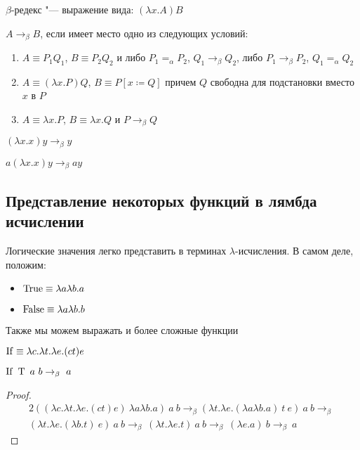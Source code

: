 \begin{definition}
	$\beta$-редекс "--- выражение вида: $\left(\lambda{}x.A\right)B$
\end{definition}

\begin{definition}
	$A\to_{\beta}B$, если имеет место одно из следующих условий:
	\begin{enumerate}
		\item $A\equiv{}P_{1}Q_{1}$, $B\equiv{}P_{2}Q_{2}$ и либо $P_{1}=_{\alpha}P_{2}$, $Q_{1}\to_{\beta}Q_{2}$, либо
		$P_{1}\to_{\beta}P_{2}$, $Q_{1}=_{\alpha}Q_{2}$
		\item $A\equiv\left(\lambda{}x.P\right) Q$, $B\equiv P[x\coloneqq{}Q]$ причем $Q$ свободна для подстановки вместо $x$ в $P$ 
		\item $A\equiv\lambda{}x.P$, $B\equiv\lambda{}x.Q$ и $P\to_{\beta}Q$
	\end{enumerate}
	\begin{example} 
		$\left(\lambda{}x.x\right) y\to_{\beta} y$
	\end{example}
	\begin{example}
		 $a \left(\lambda{}x.x\right) y\to_{\beta} a y$
	\end{example}
\end{definition}

\subsection{Представление некоторых функций в лямбда исчислении}
Логические значения легко представить в терминах $\lambda$-исчисления. В самом деле, положим:
\begin{itemize}
	\item $\operatorname{True}  \equiv \lambda{}a\lambda{}b.a$ 
	\item $\operatorname{False} \equiv \lambda{}a\lambda{}b.b$
\end{itemize}

\newcommand{\If}{\lambda{}c.\lambda{}t.\lambda{}e.(c t) e}
\newcommand{\T}{\lambda{}a\lambda{}b.a}
\newcommand{\F}{\lambda{}a\lambda{}b.b}
\newcommand{\Fl}{\func{F}}
\newcommand{\Tl}{\func{T}}


Также мы можем выражать и более сложные функции \\


\begin{definition}
	$\func{If} \equiv \If$
\end{definition}

\begin{example}
	$\func{If} \ \Tl \ a \ b \to_{\beta} \ a$
	\begin{proof}
		\begin{alignat*}{2}
		 ((\If) \ \T)\ a \ b \to_{\beta} (\lambda{}t.\lambda{}e.(\T) \ t \ e) \ a \ b \to_{\beta} \ \\ (\lambda{}t.\lambda{}e.(\lambda{}b.t) \ e) \ a \ b \to_{\beta} \ (\lambda{}t.\lambda{}e.t) \ a \ b \to_{\beta} \ (\lambda{}e.a) \ b \to_{\beta} \ a
		\end{alignat*}
	\end{proof}
\end{example}

